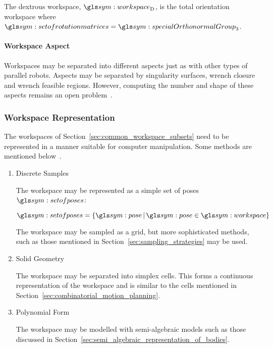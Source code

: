 				The dextrous workspace, $\workspace_{\mathrm{D}}$, is the  total
				orientation   workspace    where	$\setofrotationmatrices    =
                \specialOrthonormalGroup{3}$.

            \paragraph{Workspace Aspect}%
            \label{sec:workspace_aspect}

				Workspaces may be separated into different aspects just as with
				other types of parallel robots. Aspects may be separated by
				singularity surfaces, wrench closure and wrench feasible
				regions. However, computing the number and shape of these
				aspects remains an open
				problem~\cite{bib:cdpr:cable_driven_parallel_robots_theory_and_application}.

		\subsubsection{Workspace Representation}%
		\label{sec:workspace_representation}

			The workspaces of Section~\ref{sec:common_workspace_subsets} need to
			be represented in a manner suitable for computer manipulation. Some
			methods are mentioned
			below~\cite{bib:cdpr:cable_driven_parallel_robots_theory_and_application}\cite{bib:planning:planning_algorithms}.

			\begin{enumerate}

				\item Discrete Samples

					The workspace may be  represented  as  a  simple  set  of
					poses $\setofposes$:

					\begin{equation}
						\setofposes =
							\left\{
								\pose
								\,\middle|\,
								\pose\in\workspace
							\right\}
					\end{equation}

					The workspace may be sampled as a grid, but  more
					sophisticated methods, such as those mentioned in
					Section~\ref{sec:sampling_strategies} may be used.

				\item Solid Geometry

					The workspace may be separated into simplex cells.	This
					forms a continuous representation of the workspace and is
					similar to the cells mentioned in
					Section~\ref{sec:combinatorial_motion_planning}.

				\item Polynomial Form

					The workspace may be modelled with semi-algebraic models
					such as those discussed in
					Section~\ref{sec:semi_algebraic_representation_of_bodies}.

			\end{enumerate}

